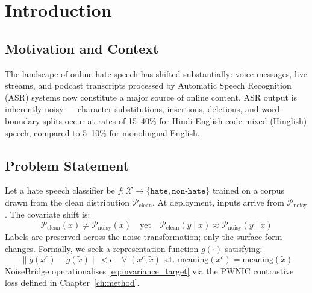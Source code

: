 \documentclass[12pt,a4paper]{report}
\begin{document}
\chapter{Introduction}

\section{Motivation and Context}
The landscape of online hate speech has shifted substantially: voice messages, live streams, and podcast transcripts processed by Automatic Speech Recognition (ASR) systems now constitute a major source of online content. ASR output is inherently noisy --- character substitutions, insertions, deletions, and word-boundary splits occur at rates of 15--40\% for Hindi-English code-mixed (Hinglish) speech, compared to 5--10\% for monolingual English.

\section{Problem Statement}
Let a hate speech classifier be $f: \mathcal{X} \rightarrow \{\texttt{hate}, \texttt{non-hate}\}$ trained on a corpus drawn from the clean distribution $\mathcal{P}_{\text{clean}}$. At deployment, inputs arrive from $\mathcal{P}_{\text{noisy}}$. The covariate shift is:
\begin{equation}
  \mathcal{P}_{\text{clean}}(x) \neq \mathcal{P}_{\text{noisy}}(\tilde{x})
  \quad \text{yet} \quad
  \mathcal{P}_{\text{clean}}(y \mid x) \approx \mathcal{P}_{\text{noisy}}(y \mid \tilde{x})
  \label{eq:covariate_shift}
\end{equation}
Labels are preserved across the noise transformation; only the surface form changes. Formally, we seek a representation function $g(\cdot)$ satisfying:
\begin{equation}
  \bigl\| g(x^c) - g(\tilde{x}) \bigr\| < \epsilon
  \quad \forall\; (x^c, \tilde{x}) \text{ s.t. } \mathrm{meaning}(x^c) = \mathrm{meaning}(\tilde{x})
  \label{eq:invariance_target}
\end{equation}
NoiseBridge operationalises \eqref{eq:invariance_target} via the PWNIC contrastive loss defined in Chapter~\ref{ch:method}.
\end{document}
